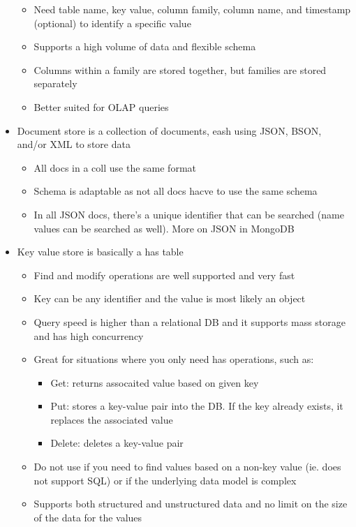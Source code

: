 \documentclass[8pt,landscape,a4paper, fleqn, dvipsnames]{extarticle}
\begin{document}
\begin{multicols*}{4}
\begin{itemize}
\begin{itemize}
\begin{itemize}
        \end{itemize}
        \item Need table name, key value, column family, column name, and timestamp (optional) to identify a specific value
        \item Supports a high volume of data and flexible schema
        \item Columns within a family are stored together, but families are stored separately
        \item Better suited for OLAP queries
    \end{itemize}
    \item Document store is a collection of documents, eash using JSON, BSON, and/or XML to store data
    \begin{itemize}
        \item All docs in a coll use the same format
        \item Schema is adaptable as not all docs hacve to use the same schema
        \item In all JSON docs, there's a unique identifier that can be searched (name values can be searched as well). More on JSON in MongoDB
    \end{itemize}
    \item Key value store is basically a has table
    \begin{itemize}
        \item Find and modify operations are well supported and very fast
        \item Key can be any identifier and the value is most likely an object
        \item Query speed is higher than a relational DB and it supports mass storage and has high concurrency
        \item Great for situations where you only need has operations, such as:
        \begin{itemize}
            \item Get: returns assocaited value based on given key
            \item Put: stores a key-value pair into the DB. If the key already exists, it replaces the associated value
            \item Delete: deletes a key-value pair
        \end{itemize}
        \item Do not use if you need to find values based on a non-key value (ie. does not support SQL) or if the underlying data model is complex
        \item Supports both structured and unstructured data and no limit on the size of the data for the values

\end{itemize}
\end{itemize}
\end{multicols*}
\end{document}
